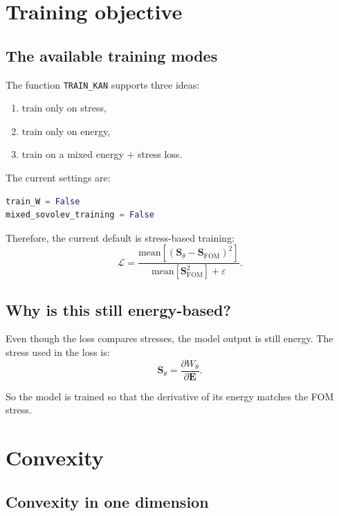 \documentclass[11pt]{article}
\newcommand{\E}{\bm{E}}
\newcommand{\Sstress}{\bm{S}}
\begin{document}
\section{Training objective}

\subsection{The available training modes}

The function \texttt{TRAIN\_KAN} supports three ideas:

\begin{enumerate}[leftmargin=2em]
  \item train only on stress,
  \item train only on energy,
  \item train on a mixed energy + stress loss.
\end{enumerate}

The current settings are:

\begin{lstlisting}[language=Python]
train_W = False
mixed_sovolev_training = False
\end{lstlisting}

Therefore, the current default is stress-based training:
\[
  \mathcal{L}
  =
  \frac{
    \mathrm{mean}\left[
      \left(
        \Sstress_{\theta}
        -
        \Sstress_{\mathrm{FOM}}
      \right)^2
    \right]
  }{
    \mathrm{mean}\left[
      \Sstress_{\mathrm{FOM}}^2
    \right]
    +
    \varepsilon
  }.
\]

\subsection{Why is this still energy-based?}

Even though the loss compares stresses, the model output is still energy. The
stress used in the loss is:
\[
  \Sstress_{\theta}
  =
  \frac{\partial W_{\theta}}{\partial \E}.
\]

So the model is trained so that the derivative of its energy matches the FOM
stress.

\section{Convexity}

\subsection{Convexity in one dimension}
\end{document}
